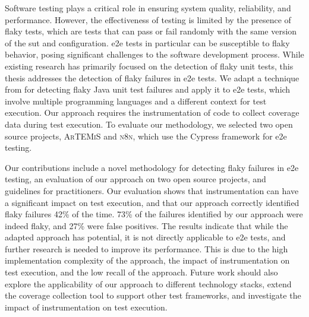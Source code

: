 
Software testing plays a critical role in ensuring system quality, reliability, and performance. 
However, the effectiveness of testing is limited by the presence of flaky tests, which are tests that can pass or fail randomly with the same version of the \acf*{sut} and configuration.
\acf*{e2e} tests in particular can be susceptible to flaky behavior, posing significant challenges to the software development process. 
While existing research has primarily focused on the detection of flaky unit tests, this thesis addresses the detection of flaky failures in \acs*{e2e} tests. 
We adapt a technique from \citeauthor*{bell_deflaker_2018} for detecting flaky Java unit test failures and apply it to \acs*{e2e} tests, which involve multiple programming languages and a different context for test execution. Our approach requires the instrumentation of code to collect coverage data during test execution. 
To evaluate our methodology, we selected two open source projects, \textsc{ArTEMiS} and \textsc{n8n}, which use the Cypress framework for \acs*{e2e} testing.

Our contributions include a novel methodology for detecting flaky failures in \acs*{e2e} testing, an evaluation of our approach on two open source projects, and guidelines for practitioners. 
Our evaluation shows that instrumentation can have a significant impact on test execution, and that our approach correctly identified flaky failures 42\% of the time. 
73\% of the failures identified by our approach were indeed flaky, and 27\% were false positives.
The results indicate that while the adapted approach has potential, it is not directly applicable to \acs*{e2e} tests, and further research is needed to improve its performance. 
This is due to the high implementation complexity of the approach, the impact of instrumentation on test execution, and the low recall of the approach.
Future work should also explore the applicability of our approach to different technology stacks, extend the coverage collection tool to support other test frameworks, and investigate the impact of instrumentation on test execution.